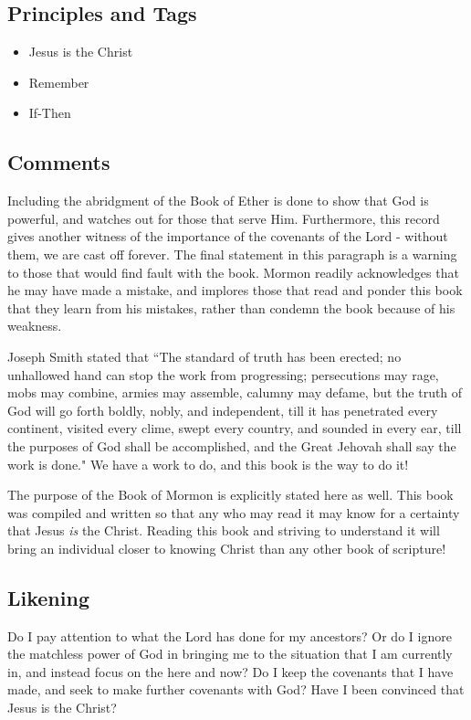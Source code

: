 \documentclass[12pt]{report}
\begin{document}
\subsection{Principles and Tags\label{titlePage:principles3}}
\begin{itemize}
\item {}Jesus is the Christ
\item {}Remember
\item {}If-Then
\end{itemize}

\subsection{Comments\label{titlePage:comments3}}
Including the abridgment of the Book of Ether is done to show that God is powerful, and watches out for those that serve Him.  Furthermore, this record gives another witness of the importance of the covenants of the Lord - without them, we are cast off forever.  The final statement in this paragraph is a warning to those that would find fault with the book.  Mormon readily acknowledges that he may have made a mistake, and implores those that read and ponder this book that they learn from his mistakes, rather than condemn the book because of his weakness.

Joseph Smith stated that ``The standard of truth has been erected; no unhallowed hand can stop the work from progressing; persecutions may rage, mobs may combine, armies may assemble, calumny may defame, but the truth of God will go forth boldly, nobly, and independent, till it has penetrated every continent, visited every clime, swept every country, and sounded in every ear, till the purposes of God shall be accomplished, and the Great Jehovah shall say the work is done."  We have a work to do, and this book is the way to do it!

The purpose of the Book of Mormon is explicitly stated here as well.  This book was compiled and written so that any who may read it may know for a certainty that Jesus \emph{is} the Christ.  Reading this book and striving to understand it will bring an individual closer to knowing Christ than any other book of scripture!

\subsection{Likening\label{titlePage:likening3}}
Do I pay attention to what the Lord has done for my ancestors?  Or do I ignore the matchless power of God in bringing me to the situation that I am currently in, and instead focus on the here and now?  Do I keep the covenants that I have made, and seek to make further covenants with God?  Have I been convinced that Jesus is the Christ?
\end{document}
